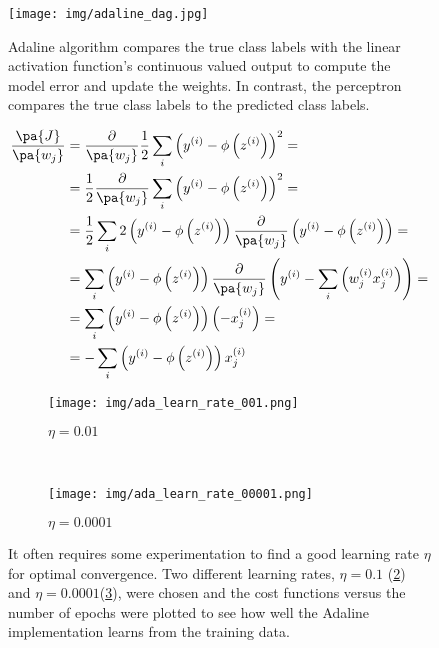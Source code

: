 \begin{figure}[hbt!]
    \centering
    \texttt{[image: img/adaline\_dag.jpg]}
    \caption{Adaline algorithm compares the true class labels with the linear activation function's continuous valued output to compute the model error and update the weights.
    In contrast, the perceptron compares the true class labels to the predicted class labels.}
    \label{fig:adaline_dag}
\end{figure}


\begin{equation}
    \begin{split}
        \frac{ \pa{J} } { \pa{w_j} } & =
        \frac{\partial} {\pa{w_j}} \frac{1} {2} \sum \limits_i \left( y^{(i)} - \phi \left( z^{(i)} \right) \right) ^2 = \\
        & = \frac{1} {2} \frac{\partial} {\pa{w_j}} \sum \limits_i \left( y^{(i)} - \phi \left( z^{(i)} \right) \right) ^2 = \\
        & = \frac{1} {2} \sum \limits_i 2 \left( y^{(i)} - \phi \left( z^{(i)} \right) \right) \frac{\partial} {\pa{w_j}} \left( y^{(i)} - \phi \left( z^{(i)} \right) \right) = \\
        & = \sum \limits_i \left( y^{(i)} - \phi \left( z^{(i)} \right) \right) \frac{\partial} {\pa{w_j}} \left( y^{(i)} - \sum \limits_i \left( w_j^{(i)} x_j^{(i)} \right) \right) = \\
        & = \sum \limits_i \left( y^{(i)} - \phi \left( z^{(i)} \right) \right) \left( - x_j^{(i)} \right) = \\
        & = -\sum \limits_i \left( y^{(i)} - \phi \left( z^{(i)} \right) \right) x_j^{(i)}
    \end{split}
\end{equation}

\begin{figure}[hbt!]
    \centering
    \begin{subfigure}[t]{.48\textwidth}
        \centering
        \texttt{[image: img/ada\_learn\_rate\_001.png]}
        \caption{$\eta=0.01$}
        \label{fig:ada_learn_rate_001}
    \end{subfigure}
    ~ %
    \begin{subfigure}[t]{.48\textwidth}
        \centering
        \texttt{[image: img/ada\_learn\_rate\_00001.png]}
        \caption{$\eta=0.0001$}
        \label{fig:ada_learn_rate_00001}
    \end{subfigure}
    \caption{It often requires some experimentation to find a good learning rate $\eta$ for optimal convergence.
    Two different learning rates, $\eta=0.1$ (\ref{fig:ada_learn_rate_001}) and $\eta=0.0001$(\ref{fig:ada_learn_rate_00001}), were chosen and the cost functions versus the number of epochs were plotted to see how well the Adaline implementation learns from the training data.}
    \label{fig:ada_learn_rate}
\end{figure}


